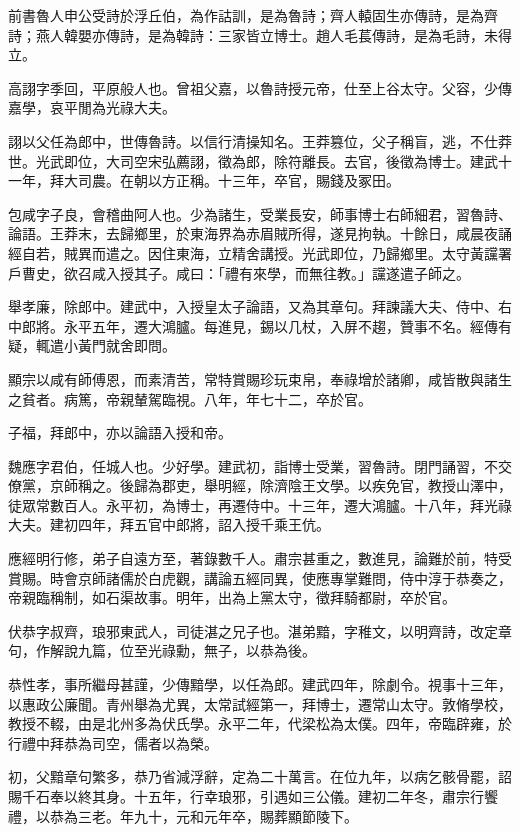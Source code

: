 
\begin{pinyinscope}
前書魯人申公受詩於浮丘伯，為作詁訓，是為魯詩；齊人轅固生亦傳詩，是為齊詩；燕人韓嬰亦傳詩，是為韓詩：三家皆立博士。趙人毛萇傳詩，是為毛詩，未得立。

高詡字季回，平原般人也。曾祖父嘉，以魯詩授元帝，仕至上谷太守。父容，少傳嘉學，哀平閒為光祿大夫。

詡以父任為郎中，世傳魯詩。以信行清操知名。王莽篡位，父子稱盲，逃，不仕莽世。光武即位，大司空宋弘薦詡，徵為郎，除符離長。去官，後徵為博士。建武十一年，拜大司農。在朝以方正稱。十三年，卒官，賜錢及冢田。

包咸字子良，會稽曲阿人也。少為諸生，受業長安，師事博士右師細君，習魯詩、論語。王莽末，去歸鄉里，於東海界為赤眉賊所得，遂見拘執。十餘日，咸晨夜誦經自若，賊異而遣之。因住東海，立精舍講授。光武即位，乃歸鄉里。太守黃讜署戶曹史，欲召咸入授其子。咸曰：「禮有來學，而無往教。」讜遂遣子師之。

舉孝廉，除郎中。建武中，入授皇太子論語，又為其章句。拜諫議大夫、侍中、右中郎將。永平五年，遷大鴻臚。每進見，錫以几杖，入屏不趨，贊事不名。經傳有疑，輒遣小黃門就舍即問。

顯宗以咸有師傅恩，而素清苦，常特賞賜珍玩束帛，奉祿增於諸卿，咸皆散與諸生之貧者。病篤，帝親輦駕臨視。八年，年七十二，卒於官。

子福，拜郎中，亦以論語入授和帝。

魏應字君伯，任城人也。少好學。建武初，詣博士受業，習魯詩。閉門誦習，不交僚黨，京師稱之。後歸為郡吏，舉明經，除濟陰王文學。以疾免官，教授山澤中，徒眾常數百人。永平初，為博士，再遷侍中。十三年，遷大鴻臚。十八年，拜光祿大夫。建初四年，拜五官中郎將，詔入授千乘王伉。

應經明行修，弟子自遠方至，著錄數千人。肅宗甚重之，數進見，論難於前，特受賞賜。時會京師諸儒於白虎觀，講論五經同異，使應專掌難問，侍中淳于恭奏之，帝親臨稱制，如石渠故事。明年，出為上黨太守，徵拜騎都尉，卒於官。

伏恭字叔齊，琅邪東武人，司徒湛之兄子也。湛弟黯，字稚文，以明齊詩，改定章句，作解說九篇，位至光祿勳，無子，以恭為後。

恭性孝，事所繼母甚謹，少傳黯學，以任為郎。建武四年，除劇令。視事十三年，以惠政公廉聞。青州舉為尤異，太常試經第一，拜博士，遷常山太守。敦脩學校，教授不輟，由是北州多為伏氏學。永平二年，代梁松為太僕。四年，帝臨辟雍，於行禮中拜恭為司空，儒者以為榮。

初，父黯章句繁多，恭乃省減浮辭，定為二十萬言。在位九年，以病乞骸骨罷，詔賜千石奉以終其身。十五年，行幸琅邪，引遇如三公儀。建初二年冬，肅宗行饗禮，以恭為三老。年九十，元和元年卒，賜葬顯節陵下。


\end{pinyinscope}

